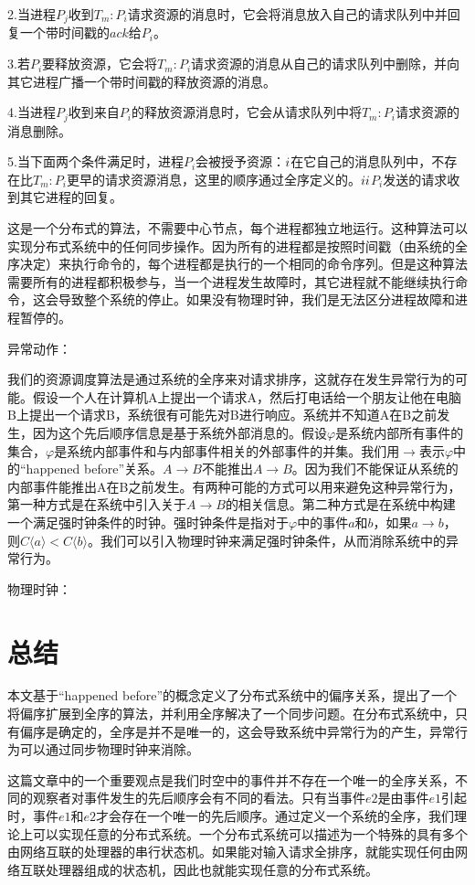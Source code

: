 \documentclass[UTF8]{article}
\begin{document}
	2.当进程$P_j$收到$T_m:P_i$请求资源的消息时，它会将消息放入自己的请求队列中并回复一个带时间戳的$ack$给$P_i$。

	3.若$P_i$要释放资源，它会将$T_m:P_i$请求资源的消息从自己的请求队列中删除，并向其它进程广播一个带时间戳的释放资源的消息。

	4.当进程$P_j$收到来自$P_i$的释放资源消息时，它会从请求队列中将$T_m:P_i$请求资源的消息删除。
	
	5.当下面两个条件满足时，进程$P_i$会被授予资源：$\romannumeral1$在它自己的消息队列中，不存在比$T_m:P_i$更早的请求资源消息，这里的顺序通过全序定义的。$\romannumeral2$$P_i$发送的请求收到其它进程的回复。

	这是一个分布式的算法，不需要中心节点，每个进程都独立地运行。这种算法可以实现分布式系统中的任何同步操作。因为所有的进程都是按照时间戳（由系统的全序决定）来执行命令的，每个进程都是执行的一个相同的命令序列。但是这种算法需要所有的进程都积极参与，当一个进程发生故障时，其它进程就不能继续执行命令，这会导致整个系统的停止。如果没有物理时钟，我们是无法区分进程故障和进程暂停的。

	异常动作：

	我们的资源调度算法是通过系统的全序来对请求排序，这就存在发生异常行为的可能。假设一个人在计算机A上提出一个请求A，然后打电话给一个朋友让他在电脑B上提出一个请求B，系统很有可能先对B进行响应。系统并不知道A在B之前发生，因为这个先后顺序信息是基于系统外部消息的。假设$\varphi$是系统内部所有事件的集合，\underline{$\varphi$}是系统内部事件和与内部事件相关的外部事件的并集。我们用$\boldsymbol{\rightarrow}$表示\underline{$\varphi$}中的“happened before”关系。$A \boldsymbol{\rightarrow} B$不能推出$A \rightarrow B$。因为我们不能保证从系统的内部事件能推出A在B之前发生。有两种可能的方式可以用来避免这种异常行为，第一种方式是在系统中引入关于$A \boldsymbol{\rightarrow} B$的相关信息。第二种方式是在系统中构建一个满足强时钟条件的时钟。强时钟条件是指对于$\varphi$中的事件$a$和$b$，如果$a \boldsymbol{\rightarrow} b$，则$C\langle a \rangle < C\langle b\rangle$。我们可以引入物理时钟来满足强时钟条件，从而消除系统中的异常行为。

	物理时钟：

\section{总结}
	本文基于“happened before”的概念定义了分布式系统中的偏序关系，提出了一个将偏序扩展到全序的算法，并利用全序解决了一个同步问题。在分布式系统中，只有偏序是确定的，全序是并不是唯一的，这会导致系统中异常行为的产生，异常行为可以通过同步物理时钟来消除。
	
	这篇文章中的一个重要观点是我们时空中的事件并不存在一个唯一的全序关系，不同的观察者对事件发生的先后顺序会有不同的看法。只有当事件$e2$是由事件$e1$引起时，事件$e1$和$e2$才会存在一个唯一的先后顺序。通过定义一个系统的全序，我们理论上可以实现任意的分布式系统。一个分布式系统可以描述为一个特殊的具有多个由网络互联的处理器的串行状态机。如果能对输入请求全排序，就能实现任何由网络互联处理器组成的状态机，因此也就能实现任意的分布式系统。
	

\end{document}
